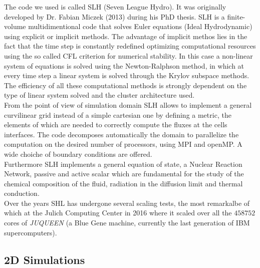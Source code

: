 \documentclass[11pt]{article}
\numberwithin{equation}{section}
\begin{document}
The code we used is called SLH (Seven League Hydro). It was originally developed by Dr. Fabian Miczek (2013) during his PhD thesis. SLH is a finite-volume multidimentional code that solves Euler equations (Ideal Hydrodynamic) using explicit or implicit methods. The advantage of implicit methos lies in the fact that the time step is constantly redefined optimizing computational resources using the so called CFL criterion for numerical stability. In this case a non-linear system of equations is solved using the Newton-Ralphson method, in which at every time step a linear system is solved through the Krylov subspace methods. The efficiency of all these computational methods is strongly dependent on the type of linear system solved and the cluster architecture used. \\
From the point of view of simulation domain SLH allows to implement a general curvilinear grid instead of a simple cartesian one by defining a metric, the elements of which are needed to correctly compute the fluxes at the cells interfaces. The code decomposes automatically the domain to parallelize the computation on the desired number of processors, using MPI and openMP. A wide choiche of boundary conditions are offered. \\
Furthermore SLH implements a general equation of state, a Nuclear Reaction Network, passive and active scalar which are fundamental for the study of the chemical composition of the fluid, radiation in the diffusion limit and thermal conduction. \\
Over the years SHL has undergone several scaling tests, the most remarkalbe of which at the Julich Computing Center in 2016 where it scaled over all the $458752$ cores of \textit{JUQUEEN} (a Blue Gene machine, currently the last generation of IBM supercomputers).
\subsection{2D Simulations}
\end{document}
